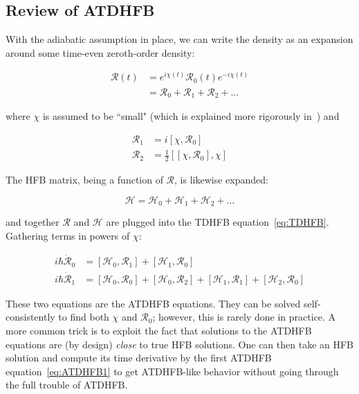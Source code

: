 \subsection{Review of ATDHFB}

With the adiabatic assumption in place, we can write the density as an expansion around some time-even zeroth-order density:

\begin{align}
\mathcal{R}(t) 
&= e^{i\chi(t)}\mathcal{R}_0(t)e^{-i\chi(t)} \\
&= \mathcal{R}_0 + \mathcal{R}_1 + \mathcal{R}_2 + \dots
\end{align}

\noindent where $\chi$ is assumed to be ``small" (which is explained more rigorously in~\cite{Baranger1978}) and

\begin{align}\label{eqn:densities1}
\mathcal{R}_1 &= i\left[\chi, \mathcal{R}_0\right] \\
\label{eqn:densities2}\mathcal{R}_2 &= \frac{1}{2}\left[\left[\chi, \mathcal{R}_0\right], \chi\right] 
\end{align}

\noindent The HFB matrix, being a function of $\mathcal{R}$, is likewise expanded:

\begin{equation}
\mathcal{H} = \mathcal{H}_0 + \mathcal{H}_1 + \mathcal{H}_2 + \dots
\end{equation}

\noindent and together $\mathcal{R}$ and $\mathcal{H}$ are plugged into the TDHFB equation~\eqref{eq:TDHFB}. Gathering terms in powers of $\chi$:

\begin{align}
i\hbar\mathcal{\dot{R}}_0 &= \left[\mathcal{H}_0, \mathcal{R}_1\right] + \left[\mathcal{H}_1, \mathcal{R}_0\right] \label{eq:ATDHFB1}\\
i\hbar\mathcal{\dot{R}}_1 &= \left[\mathcal{H}_0, \mathcal{R}_0\right] + \left[\mathcal{H}_0, \mathcal{R}_2\right]
+ \left[\mathcal{H}_1, \mathcal{R}_1\right] + \left[\mathcal{H}_2, \mathcal{R}_0\right]
\end{align}

\noindent These two equations are the ATDHFB equations. They can be solved self-consistently to find both $\chi$ and $\mathcal{R}_0$; however, this is rarely done in practice. A more common trick is to exploit the fact that solutions to the ATDHFB equations are (by design) \textit{close} to true HFB solutions. One can then take an HFB solution and compute its time derivative by the first ATDHFB equation~\eqref{eq:ATDHFB1} to get ATDHFB-like behavior without going through the full trouble of ATDHFB.

